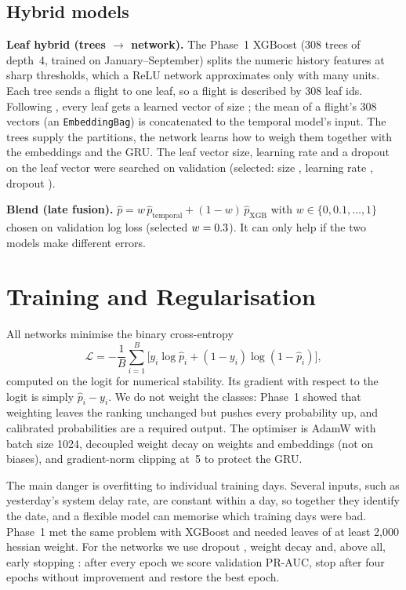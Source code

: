 \documentclass[conference]{IEEEtran}
\begin{document}
\subsection{Hybrid models}
\textbf{Leaf hybrid (trees $\rightarrow$ network).} The Phase~1 XGBoost (308 trees of
depth~4, trained on January--September) splits the numeric history features at sharp
thresholds, which a ReLU network approximates only with many units. Each tree sends a
flight to one leaf, so a flight is described by 308 leaf ids. Following
\cite{he2014facebook,ke2019deepgbm}, every leaf gets a learned vector of size
\LeafDim; the mean of a flight's 308 vectors (an \texttt{EmbeddingBag}) is concatenated
to the temporal model's input. The trees supply the partitions, the network learns how
to weigh them together with the embeddings and the GRU. The leaf vector size, learning
rate and a dropout on the leaf vector were searched on validation
(selected: size \LeafDim, learning rate \LeafLR, dropout \LeafDropout).

\textbf{Blend (late fusion).} $\hat p = w\,\hat p_{\text{temporal}} +
(1-w)\,\hat p_{\text{XGB}}$ with $w\in\{0,0.1,\dots,1\}$ chosen on validation log loss
(selected $w=0.3$). It can only help if the two models make different errors.

\section{Training and Regularisation}
All networks minimise the binary cross-entropy
\begin{equation}
\mathcal{L} = -\frac{1}{B}\sum_{i=1}^{B}\big[y_i\log\hat p_i + (1-y_i)\log(1-\hat p_i)\big],
\end{equation}
computed on the logit for numerical stability. Its gradient with respect to the logit is
simply $\hat p_i - y_i$. We do not weight the classes: Phase~1 showed that weighting
leaves the ranking unchanged but pushes every probability up, and calibrated
probabilities are a required output. The optimiser is AdamW
\cite{loshchilov2019adamw} with batch size 1024, decoupled weight decay on weights and
embeddings (not on biases), and gradient-norm clipping at~5 to protect the GRU.

The main danger is overfitting to individual training days. Several inputs, such as
yesterday's system delay rate, are constant within a day, so together they identify the
date, and a flexible model can memorise which training days were bad. Phase~1 met the
same problem with XGBoost and needed leaves of at least 2{,}000 hessian weight. For the
networks we use dropout \cite{srivastava2014dropout}, weight decay and, above all, early
stopping \cite{prechelt1998}: after every epoch we score validation PR-AUC, stop after
four epochs without improvement and restore the best epoch.
\end{document}
